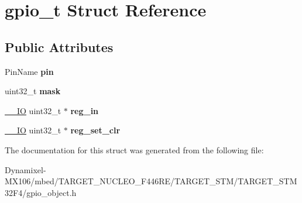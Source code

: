 \hypertarget{structgpio__t}{}\section{gpio\+\_\+t Struct Reference}
\label{structgpio__t}
\subsection*{Public Attributes}
\begin{DoxyCompactItemize}
\item 
Pin\+Name {\bfseries pin}\hypertarget{structgpio__t_ae31fd8dc09fc2058c8238b96a32523c6}{}\label{structgpio__t_ae31fd8dc09fc2058c8238b96a32523c6}

\item 
uint32\+\_\+t {\bfseries mask}\hypertarget{structgpio__t_af0180458c13ff4dba12281b3d763b574}{}\label{structgpio__t_af0180458c13ff4dba12281b3d763b574}

\item 
\hyperlink{core__sc300_8h_aec43007d9998a0a0e01faede4133d6be}{\+\_\+\+\_\+\+IO} uint32\+\_\+t $\ast$ {\bfseries reg\+\_\+in}\hypertarget{structgpio__t_a3ffb159e16fd0800f20fb0f6beff6487}{}\label{structgpio__t_a3ffb159e16fd0800f20fb0f6beff6487}

\item 
\hyperlink{core__sc300_8h_aec43007d9998a0a0e01faede4133d6be}{\+\_\+\+\_\+\+IO} uint32\+\_\+t $\ast$ {\bfseries reg\+\_\+set\+\_\+clr}\hypertarget{structgpio__t_ad3035c4efcc8079864eca93429afffb5}{}\label{structgpio__t_ad3035c4efcc8079864eca93429afffb5}

\end{DoxyCompactItemize}


The documentation for this struct was generated from the following file\+:\begin{DoxyCompactItemize}
\item 
Dynamixel-\/\+M\+X106/mbed/\+T\+A\+R\+G\+E\+T\+\_\+\+N\+U\+C\+L\+E\+O\+\_\+\+F446\+R\+E/\+T\+A\+R\+G\+E\+T\+\_\+\+S\+T\+M/\+T\+A\+R\+G\+E\+T\+\_\+\+S\+T\+M32\+F4/gpio\+\_\+object.\+h\end{DoxyCompactItemize}
